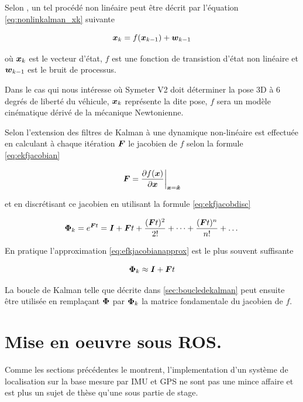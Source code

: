 \documentclass[12pt,a4paper]{report}
\begin{document}
	\para Selon \cite{menegatti_generalized_2016}, un tel procédé non linéaire peut être décrit par l'équation \ref{eq:nonlinkalman_xk} suivante
	
	\begin{equation}
	\label{eq:nonlinkalman_xk}
	\boldsymbol{x}_k = f(\boldsymbol{x}_{k-1}) + \boldsymbol{w}_{k-1}
	\end{equation}
	
	où $\boldsymbol{x}_k$ est le vecteur d'état, $f$ est une fonction de transistion d'état non linéaire et $\boldsymbol{w}_{k-1}$ est le bruit de processus.
	
	\para Dans le cas qui nous intéresse où Symeter V2 doit déterminer la pose 3D à 6 degrés de liberté du véhicule, $\boldsymbol{x}_k$ représente la dite pose, $f$ sera un modèle cinématique dérivé de la mécanique Newtonienne.
	
	\para Selon \cite{zarchan_fundamentals_2009} l'extension des filtres de Kalman à une dynamique non-linéaire est effectuée en calculant à chaque itération $\boldsymbol{F}$ le jacobien de $f$ selon la formule \ref{eq:ekfjacobian}
	
	\begin{equation}
	\label{eq:ekfjacobian}
	\boldsymbol{F} = \frac{\partial f(\boldsymbol{x})}{\partial \boldsymbol{x}} \bigg\rvert_{\boldsymbol{x}= \boldsymbol{\hat{x}}}
	\end{equation}
	
	\para et en discrétisant ce jacobien en utilisant la formule \ref{eq:ekfjacobdisc}
	
	\begin{equation}
	\label{eq:ekfjacobdisc}
	\boldsymbol{\Phi}_k = e^{\boldsymbol Ft} = \boldsymbol I + \boldsymbol Ft + \frac{(\boldsymbol Ft)^2}{2!} + \dots + \frac{(\boldsymbol Ft)^n}{n!} + \dots
	\end{equation}
	
	\para En pratique l'approximation \ref{eq:efkjacobianapprox} est le plus souvent suffisante
	
	\begin{equation}
	\label{eq:efkjacobianapprox}
	\boldsymbol{\Phi}_k \approx \boldsymbol I + \boldsymbol Ft
	\end{equation}
	
	La boucle de Kalman telle que décrite dans \ref{sec:boucledekalman} peut ensuite être utilisée en remplaçant $\boldsymbol{\Phi}$ par $\boldsymbol{\Phi}_k$ la matrice fondamentale du jacobien de $f$.

	
	\section{Mise en oeuvre sous ROS.} Comme les sections précédentes le montrent, l'implementation d'un système de localisation sur la base mesure par IMU et GPS ne sont pas une mince affaire et est plus un sujet de thèse qu'une sous partie de stage. 
	
\end{document}
